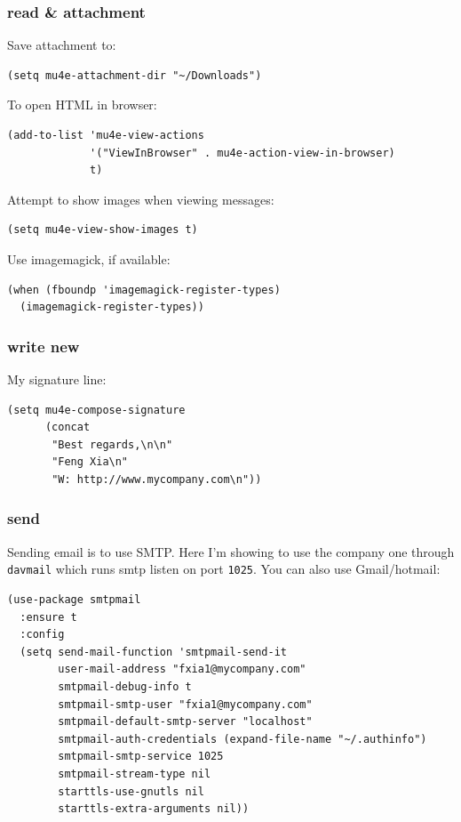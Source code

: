 \documentclass[11pt]{article}
\begin{document}
\subsubsection{read \& attachment}
\label{sec:org016c820}
Save attachment to:

\begin{verbatim}
(setq mu4e-attachment-dir "~/Downloads")
\end{verbatim}

To open HTML in browser:
\begin{verbatim}
(add-to-list 'mu4e-view-actions
             '("ViewInBrowser" . mu4e-action-view-in-browser)
             t)
\end{verbatim}

Attempt to show images when viewing messages:

\begin{verbatim}
(setq mu4e-view-show-images t)
\end{verbatim}

Use imagemagick, if available:

\begin{verbatim}
(when (fboundp 'imagemagick-register-types)
  (imagemagick-register-types))
\end{verbatim}
\subsubsection{write new}
\label{sec:orgda97385}
My signature line:

\begin{verbatim}
(setq mu4e-compose-signature
      (concat
       "Best regards,\n\n"
       "Feng Xia\n"
       "W: http://www.mycompany.com\n"))
\end{verbatim}
\subsubsection{send}
\label{sec:org4ebc34a}
Sending email is to use SMTP. Here I'm showing to use the company one
through \texttt{davmail} which runs smtp listen on port \texttt{1025}. You can also
use Gmail/hotmail:

\begin{verbatim}
(use-package smtpmail
  :ensure t
  :config
  (setq send-mail-function 'smtpmail-send-it
        user-mail-address "fxia1@mycompany.com"
        smtpmail-debug-info t
        smtpmail-smtp-user "fxia1@mycompany.com"
        smtpmail-default-smtp-server "localhost"
        smtpmail-auth-credentials (expand-file-name "~/.authinfo")
        smtpmail-smtp-service 1025
        smtpmail-stream-type nil
        starttls-use-gnutls nil
        starttls-extra-arguments nil))
\end{verbatim}
\end{document}
